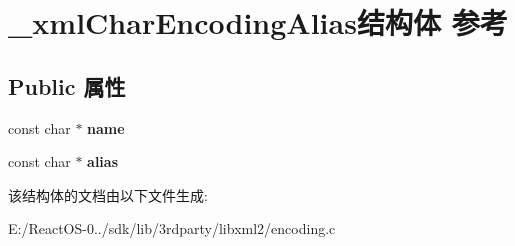 \hypertarget{struct__xml_char_encoding_alias}{}\section{\+\_\+xml\+Char\+Encoding\+Alias结构体 参考}
\label{struct__xml_char_encoding_alias}
\subsection*{Public 属性}
\begin{DoxyCompactItemize}
\item 
\mbox{\label{struct__xml_char_encoding_alias_a064415fa566c4ea71818e0e1c83e4eb3}} 
const char $\ast$ {\bfseries name}
\item 
\mbox{\label{struct__xml_char_encoding_alias_a2a5cacbbe741e8b32c9b04a9644e6d61}} 
const char $\ast$ {\bfseries alias}
\end{DoxyCompactItemize}


该结构体的文档由以下文件生成\+:\begin{DoxyCompactItemize}
\item 
E\+:/\+React\+O\+S-\/0../sdk/lib/3rdparty/libxml2/encoding.\+c\end{DoxyCompactItemize}
